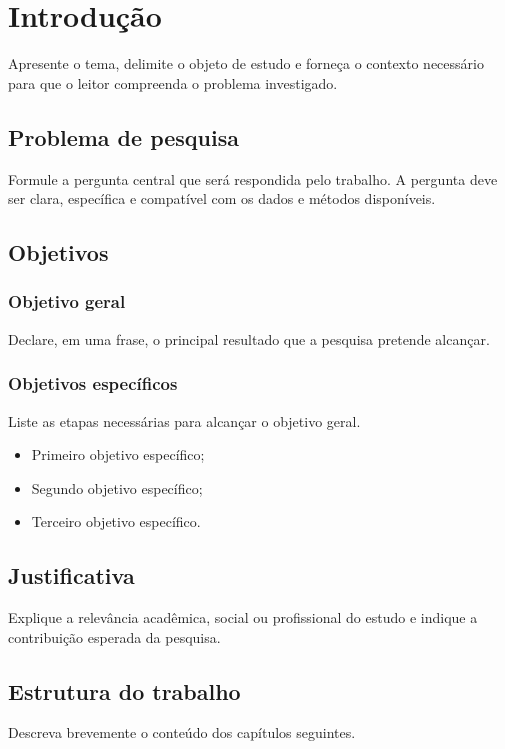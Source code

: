 \chapter{Introdução}

Apresente o tema, delimite o objeto de estudo e forneça o contexto necessário
para que o leitor compreenda o problema investigado.

\section{Problema de pesquisa}

Formule a pergunta central que será respondida pelo trabalho. A pergunta deve
ser clara, específica e compatível com os dados e métodos disponíveis.

\section{Objetivos}

\subsection{Objetivo geral}

Declare, em uma frase, o principal resultado que a pesquisa pretende alcançar.

\subsection{Objetivos específicos}

Liste as etapas necessárias para alcançar o objetivo geral.

\begin{itemize}
    \item Primeiro objetivo específico;
    \item Segundo objetivo específico;
    \item Terceiro objetivo específico.
\end{itemize}

\section{Justificativa}

Explique a relevância acadêmica, social ou profissional do estudo e indique a
contribuição esperada da pesquisa.

\section{Estrutura do trabalho}

Descreva brevemente o conteúdo dos capítulos seguintes.

